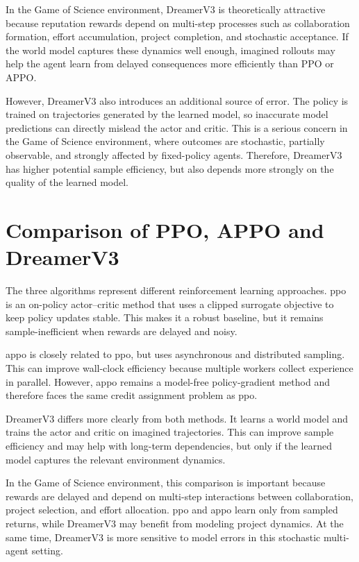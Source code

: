 \documentclass[english,bachelor]{hsluthesis}
\begin{document}
In the Game of Science environment, DreamerV3 is theoretically attractive because reputation rewards depend on multi-step processes such as collaboration formation, effort accumulation, project completion, and stochastic acceptance. If the world model captures these dynamics well enough, imagined rollouts may help the agent learn from delayed consequences more efficiently than PPO or APPO.

However, DreamerV3 also introduces an additional source of error. The policy is trained on trajectories generated by the learned model, so inaccurate model predictions can directly mislead the actor and critic. This is a serious concern in the Game of Science environment, where outcomes are stochastic, partially observable, and strongly affected by fixed-policy agents. Therefore, DreamerV3 has higher potential sample efficiency, but also depends more strongly on the quality of the learned model.

\section{Comparison of PPO, APPO and DreamerV3}

The three algorithms represent different reinforcement learning approaches. \gls{ppo} is an on-policy actor--critic method that uses a clipped surrogate objective to keep policy updates stable. This makes it a robust baseline, but it remains sample-inefficient when rewards are delayed and noisy.

\gls{appo} is closely related to \gls{ppo}, but uses asynchronous and distributed sampling. This can improve wall-clock efficiency because multiple workers collect experience in parallel. However, \gls{appo} remains a model-free policy-gradient method and therefore faces the same credit assignment problem as \gls{ppo}.

DreamerV3 differs more clearly from both methods. It learns a world model and trains the actor and critic on imagined trajectories. This can improve sample efficiency and may help with long-term dependencies, but only if the learned model captures the relevant environment dynamics.

In the Game of Science environment, this comparison is important because rewards are delayed and depend on multi-step interactions between collaboration, project selection, and effort allocation. \gls{ppo} and \gls{appo} learn only from sampled returns, while DreamerV3 may benefit from modeling project dynamics. At the same time, DreamerV3 is more sensitive to model errors in this stochastic multi-agent setting.
\end{document}
